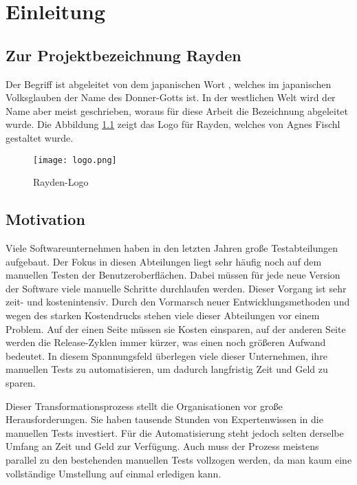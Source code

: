 \chapter{Einleitung}
\label{cha:Einleitung}

\section{Zur Projektbezeichnung Rayden}

Der Begriff  ist abgeleitet von dem japanischen Wort , welches im japanischen Volksglauben der Name des Donner-Gotts ist. In der westlichen Welt wird der Name aber meist  geschrieben, woraus für diese Arbeit die Bezeichnung  abgeleitet wurde. Die Abbildung \ref{fig:logo} zeigt das Logo für Rayden, welches von Agnes Fischl gestaltet wurde.

\begin{figure}[h]
\centering
\texttt{[image: logo.png]}
\caption{Rayden-Logo}
\label{fig:logo}
\end{figure}



\section{Motivation}

Viele Softwareunternehmen haben in den letzten Jahren große Testabteilungen aufgebaut. Der Fokus in diesen Abteilungen liegt sehr häufig noch auf dem manuellen Testen der Benutzeroberflächen. Dabei müssen für jede neue Version der Software viele manuelle Schritte durchlaufen werden. Dieser Vorgang ist sehr zeit- und kostenintensiv. Durch den Vormarsch neuer Entwicklungsmethoden und wegen des starken Kostendrucks stehen viele dieser Abteilungen vor einem Problem. Auf der einen Seite müssen sie Kosten einsparen, auf der anderen Seite werden die Release-Zyklen immer kürzer, was einen noch größeren Aufwand bedeutet. In diesem Spannungsfeld überlegen viele dieser Unternehmen, ihre manuellen Tests zu automatisieren, um dadurch langfristig Zeit und Geld zu sparen. 

\SuperPar
Dieser Transformationsprozess stellt die Organisationen vor große Herausforderungen. Sie haben tausende Stunden von Expertenwissen in die manuellen Tests investiert. Für die Automatisierung steht jedoch selten derselbe Umfang an Zeit und Geld zur Verfügung. Auch muss der Prozess meistens parallel zu den bestehenden manuellen Tests vollzogen werden, da man kaum eine vollständige Umstellung auf einmal erledigen kann.

